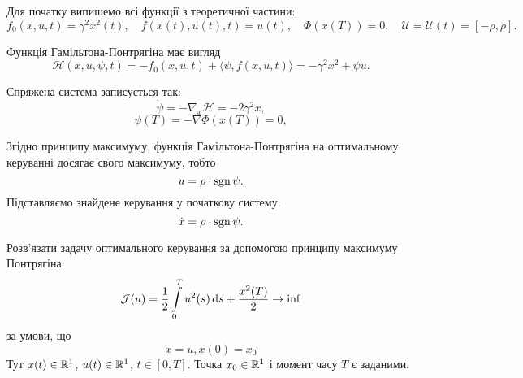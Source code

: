 \begin{solution}
    Для початку випишемо всі функції з теоретичної частини:
    \begin{equation}
        f_0(x, u, t) = \gamma^2 x^2(t), \quad f(x(t), u(t), t) = u(t), \quad \Phi(x(T)) = 0, \quad \mathcal{U} = \mathcal{U}(t) = [-\rho, \rho].
    \end{equation}
    
    Функція Гамільтона-Понтрягіна має вигляд
    \begin{equation}
        \mathcal{H} (x, u, \psi, t) = - f_0(x, u, t) + \langle \psi, f(x, u, t) \rangle = - \gamma^2 x^2 + \psi u.
    \end{equation}
    
    Спряжена система записується так:
    \begin{equation} 
        \dot \psi = - \nabla_x \mathcal{H} = - 2 \gamma^2 x,
    \end{equation}
    \begin{equation} 
        \psi(T) = - \nabla \Phi(x(T)) = 0,
    \end{equation}
    
    Згідно принципу максимуму, функція Гамільтона-Понтрягіна на оптимальному керуванні досягає свого максимуму, тобто
    \begin{equation} 
        u = \rho \cdot \operatorname{sgn} \psi.
    \end{equation} 
    Підставляємо знайдене керування у початкову систему:
    \begin{equation}
        \dot x = \rho \cdot \operatorname{sgn} \psi.
    \end{equation}
\end{solution}

\begin{problem}
    Розв'язати задачу оптимального керування за допомогою принципу максимуму Понтрягіна:
    \begin{equation*}
        \mathcal{J}(u) = \dfrac12 \displaystyle\int\limits_0^T u^2(s) \, \mathrm{d} s + \dfrac{x^2(T)}{2} \to \inf
    \end{equation*}
    за умови, що
    \begin{equation*}
        \dot x = u, x(0) = x_0
    \end{equation*}
    Тут $x(t) \in \mathbb{R}^1$, $u(t) \in \mathbb{R}^1$, $t \in [0, T]$. Точка $x_0 \in \mathbb{R}^1$ і момент часу $T$ є заданими.
\end{problem}

